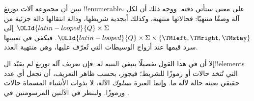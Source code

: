 \documentclass[../../../include/open-logic-section]{subfiles}
\begin{document}

\begin{explain}
نبين أن مجموعة آلات تورنغ !!{enumerable}، على معنى ستأتي دقته.
ووجه ذلك أن لكل آلة وصفًا منتهيًا: فحالاتها منتهية، وكذلك أبجدية
شريطها، ودالة انتقالها دالة جزئية من ${\OLId{latin-looped}{Q}} \times \Sigma$ إلى
${\OLId{latin-looped}{Q}} \times \Sigma \times \{\TMleft,\TMright,\TMstay\}$. فيكفي في تعيينها
سرد قيمها عند أزواج الوسيطات التي تُعرّف عليها، وهي منتهية العدد.

إلا أن في هذا القول تفصيلًا ينبغي التنبه له. فإن تعريف آلة تورنغ
لم يقيّد ال!!{element}s التي تُتخذ حالات أو رموزًا للشريط؛ فيجوز،
بحسب ظاهر التعريف، أن نجعل أي عدد حقيقي بعينه حالة لآلة ما. وإنما
العبرة ب\emph{سلوك} الآلة، لا بذوات الأشياء المسماة حالات ورموزًا.
ولننظر في الآلتين المرسومتين في .
\begin{figure}
\begin{center}
\\
\end{center}
\end{figure}
\end{explain}
\end{document}
